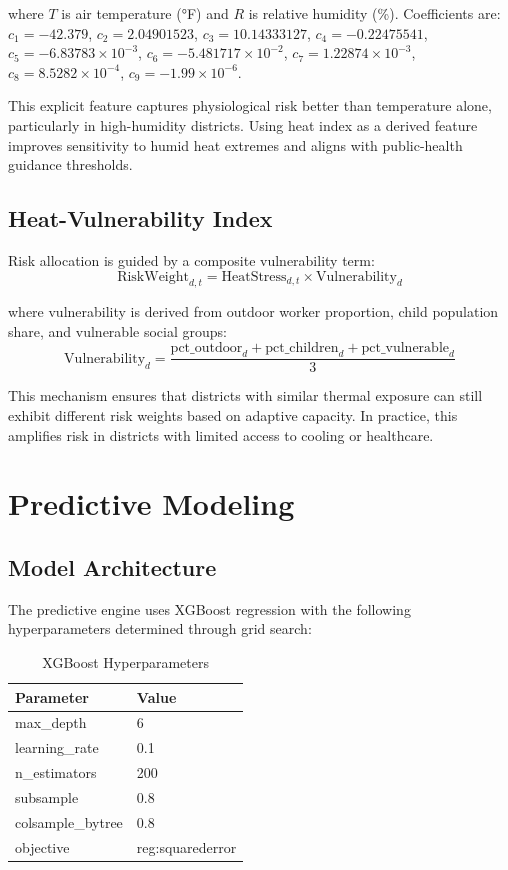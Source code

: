 \documentclass[conference]{IEEEtran}
\begin{document}
where $T$ is air temperature (°F) and $R$ is relative humidity (\%). Coefficients are: $c_1 = -42.379$, $c_2 = 2.04901523$, $c_3 = 10.14333127$, $c_4 = -0.22475541$, $c_5 = -6.83783 \times 10^{-3}$, $c_6 = -5.481717 \times 10^{-2}$, $c_7 = 1.22874 \times 10^{-3}$, $c_8 = 8.5282 \times 10^{-4}$, $c_9 = -1.99 \times 10^{-6}$.

This explicit feature captures physiological risk better than temperature alone, particularly in high-humidity districts. Using heat index as a derived feature improves sensitivity to humid heat extremes and aligns with public-health guidance thresholds.

\subsection{Heat-Vulnerability Index}
Risk allocation is guided by a composite vulnerability term:
\begin{equation}
\text{RiskWeight}_{d,t} = \text{HeatStress}_{d,t} \times \text{Vulnerability}_{d}
\label{eq:vulnerability}
\end{equation}

where vulnerability is derived from outdoor worker proportion, child population share, and vulnerable social groups:
\begin{equation}
\text{Vulnerability}_{d} = \frac{\text{pct\_outdoor}_d + \text{pct\_children}_d + \text{pct\_vulnerable}_d}{3}
\end{equation}

This mechanism ensures that districts with similar thermal exposure can still exhibit different risk weights based on adaptive capacity. In practice, this amplifies risk in districts with limited access to cooling or healthcare.

\section{Predictive Modeling}
\label{sec:modeling}

\subsection{Model Architecture}
The predictive engine uses XGBoost regression with the following hyperparameters determined through grid search:

\begin{table}[htbp]
\centering
\caption{XGBoost Hyperparameters}
\begin{tabular}{@{}ll@{}}
\toprule
\textbf{Parameter} & \textbf{Value} \\
\midrule
max\_depth & 6 \\
learning\_rate & 0.1 \\
n\_estimators & 200 \\
subsample & 0.8 \\
colsample\_bytree & 0.8 \\
objective & reg:squarederror \\
\bottomrule
\end{tabular}
\label{tab:hyperparams}
\end{table}
\end{document}
